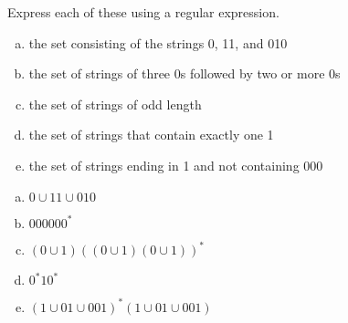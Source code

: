 \documentclass[../main.tex]{subfiles}
\begin{document}
Express each of these using a regular expression.
\begin{enumerate}[a)]
	\item the set consisting of the strings 0, 11, and 010
	\item the set of strings of three 0s followed by two or more 0s
	\item the set of strings of odd length
	\item the set of strings that contain exactly one 1
	\item the set of strings ending in 1 and not containing 000
\end{enumerate}

\solution
\begin{enumerate}[a)]
	\item $0 \cup 11 \cup 010$ 
	\item $000000^\ast$
	\item $(0 \cup 1)((0 \cup 1)(0 \cup 1))^\ast$
	\item $0^\ast10^\ast$
	\item $(1 \cup 01 \cup 001)^\ast(1 \cup 01 \cup 001)$
\end{enumerate}
\end{document}
